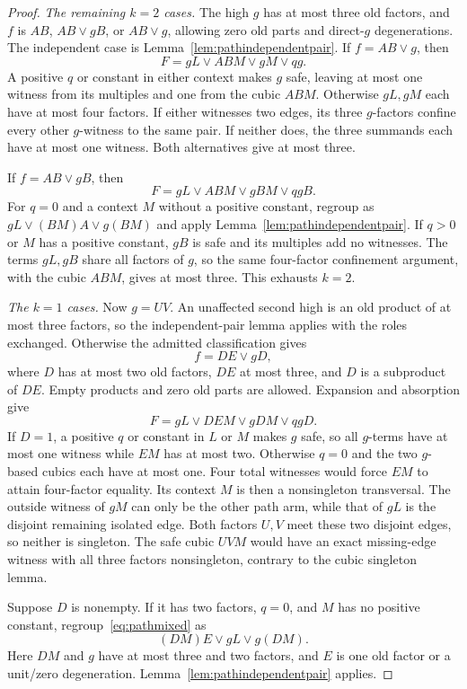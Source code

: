 \documentclass[11pt]{article}
\theoremstyle{definition}
\theoremstyle{remark}
\begin{document}
\begin{proof}
\emph{The remaining $k=2$ cases.}
The high $g$ has at most three old factors, and $f$ is $AB$, $AB\vee gB$, or $AB\vee g$, allowing zero old parts and direct-$g$ degenerations. The independent case is Lemma~\ref{lem:pathindependentpair}. If $f=AB\vee g$, then
\[
 F=gL\vee ABM\vee gM\vee qg.
\]
A positive $q$ or constant in either context makes $g$ safe, leaving at most one witness from its multiples and one from the cubic $ABM$. Otherwise $gL,gM$ each have at most four factors. If either witnesses two edges, its three $g$-factors confine every other $g$-witness to the same pair. If neither does, the three summands each have at most one witness. Both alternatives give at most three.

If $f=AB\vee gB$, then
\[
 F=gL\vee ABM\vee gBM\vee qgB.
\]
For $q=0$ and a context $M$ without a positive constant, regroup as $gL\vee(BM)A\vee g(BM)$ and apply Lemma~\ref{lem:pathindependentpair}. If $q>0$ or $M$ has a positive constant, $gB$ is safe and its multiples add no witnesses. The terms $gL,gB$ share all factors of $g$, so the same four-factor confinement argument, with the cubic $ABM$, gives at most three. This exhausts $k=2$.

\emph{The $k=1$ cases.}
Now $g=UV$. An unaffected second high is an old product of at most three factors, so the independent-pair lemma applies with the roles exchanged. Otherwise the admitted classification gives
\[
 f=DE\vee gD,
\]
where $D$ has at most two old factors, $DE$ at most three, and $D$ is a subproduct of $DE$. Empty products and zero old parts are allowed. Expansion and absorption give
\begin{equation}\label{eq:pathmixed}
 F=gL\vee DEM\vee gDM\vee qgD.
\end{equation}
If $D=1$, a positive $q$ or constant in $L$ or $M$ makes $g$ safe, so all $g$-terms have at most one witness while $EM$ has at most two. Otherwise $q=0$ and the two $g$-based cubics each have at most one. Four total witnesses would force $EM$ to attain four-factor equality. Its context $M$ is then a nonsingleton transversal. The outside witness of $gM$ can only be the other path arm, while that of $gL$ is the disjoint remaining isolated edge. Both factors $U,V$ meet these two disjoint edges, so neither is singleton. The safe cubic $UVM$ would have an exact missing-edge witness with all three factors nonsingleton, contrary to the cubic singleton lemma.

Suppose $D$ is nonempty. If it has two factors, $q=0$, and $M$ has no positive constant, regroup~\eqref{eq:pathmixed} as
\[
 (DM)E\vee gL\vee g(DM).
\]
Here $DM$ and $g$ have at most three and two factors, and $E$ is one old factor or a unit/zero degeneration. Lemma~\ref{lem:pathindependentpair} applies.


\end{proof}
\end{document}
